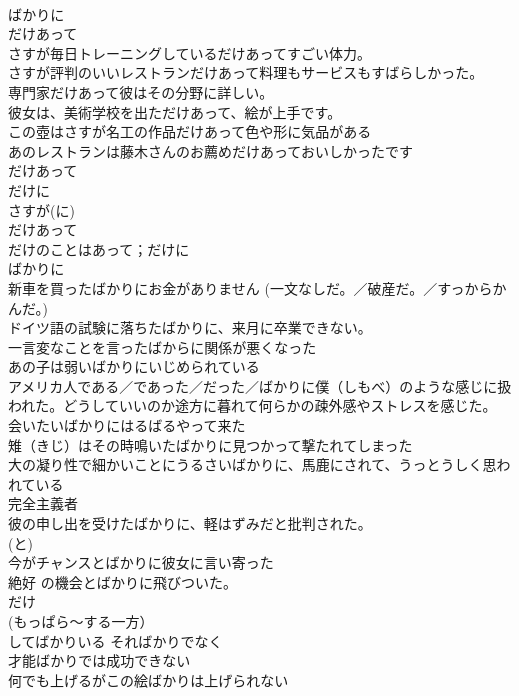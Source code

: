 \documentclass[8pt]{extreport}
\begin{document}
\begin{CJK}{UTF8}{min}
\\	ばかりに 
\\	[さすが] だけあって	
\\	さすが毎日トレーニングしているだけあってすごい体力。 
\\	さすが評判のいいレストランだけあって料理もサービスもすばらしかった。 
\\	専門家だけあって彼はその分野に詳しい。 
\\	彼女は、美術学校を出ただけあって、絵が上手です。 
\\	この壺はさすが名工の作品だけあって色や形に気品がある 
\\	あのレストランは藤木さんのお薦めだけあっておいしかったです 
\\	だけあって 
\\	だけに 
\\	さすが(に) 
\\	だけあって 
\\	だけのことはあって；だけに
\\	ばかりに 
\\	新車を買ったばかりにお金がありません (一文なしだ。／破産だ。／すっからかんだ。) 
\\	ドイツ語の試験に落ちたばかりに、来月に卒業できない。
\\	一言変なことを言ったばからに関係が悪くなった　
\\	あの子は弱いばかりにいじめられている 
\\	アメリカ人である／であった／だった／ばかりに僕（しもべ）のような感じに扱われた。どうしていいのか途方に暮れて何らかの疎外感やストレスを感じた。 
\\	会いたいばかりにはるばるやって来た 
\\	雉（きじ）はその時鳴いたばかりに見つかって撃たれてしまった 
\\	大の凝り性で細かいことにうるさいばかりに、馬鹿にされて、うっとうしく思われている 
\\	完全主義者
\\	彼の申し出を受けたばかりに、軽はずみだと批判された。 
\\	(と) 
\\	今がチャンスとばかりに彼女に言い寄った 
\\	絶好 の機会とばかりに飛びついた。 
\\	だけ 
\\	(もっぱら～する一方） 
\\	してばかりいる そればかりでなく 
\\	才能ばかりでは成功できない 
\\	何でも上げるがこの絵ばかりは上げられない 

\end{CJK}
\end{document}
